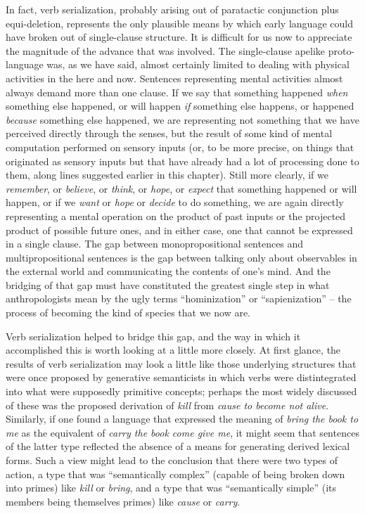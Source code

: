 In fact, verb serialization, probably arising out of paratactic conjunction plus equi-deletion, represents the only plausible means by which early language could have broken out of single-clause structure. It is difficult for us now to appreciate the magnitude of the advance that was involved. The single-clause apelike proto-language was, as we have said, almost certainly limited to dealing with physical activities in the here and now. Sentences representing mental activities almost always demand more than one clause. If we say that something happened \textit{when} something else happened, or will happen \textit{if} something else happens, or happened \textit{because} something else happened, we are representing not something that we have perceived directly through the senses, but the result of some kind of mental computation performed
on sensory inputs (or, to be more precise, on things that originated as sensory inputs but that have already had a lot of processing done to them, along lines suggested earlier in this chapter). Still more clearly, if we \textit{remember}, or \textit{believe}, or \textit{think}, or \textit{hope}, or \textit{expect} that something happened or will happen, or if we \textit{want} or \textit{hope} or \textit{decide} to do some\-thing, we are again directly representing a mental operation on the product of past inputs or the projected product of possible future ones, and in either case, one that cannot be expressed in a single clause. The gap between monopropositional sentences and multipropositional sentences is the gap between talking only about observables in the external world and communicating the contents of one's mind. And the bridging of that gap must have constituted the greatest single step in what anthropologists mean by the ugly terms ``hominization'' or ``sapienization'' -- the process of becoming the kind of species that we now are.

Verb serialization helped to bridge this gap, and the way in which it accomplished this is worth looking at a little more closely. At first glance, the results of verb serialization may look a little like those underlying structures that were once proposed by generative semanticists in which verbs were distintegrated into what were supposedly primitive concepts; perhaps the most widely discussed of these was the proposed derivation of \textit{kill} from \textit{cause to become not alive}. Similarly, if one found a language that expressed the meaning of \textit{bring the book to me} as the equivalent of \textit{carry the book come give me}, it might seem that sentences of the latter type reflected the absence of a means for generating derived lexical forms. Such a view might lead to the conclusion that there were two types of action, a type that was ``semantically complex'' (capable of being broken down into primes) like \textit{kill} or \textit{bring}, and a type that was ``semantically simple'' (its members being themselves primes) like \textit{cause} or \textit{carry}.

